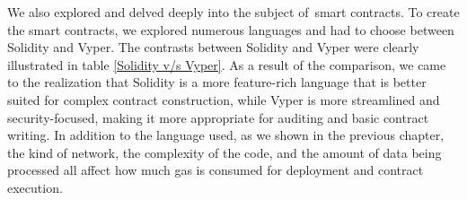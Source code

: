 \vspace{.5cm}

We also explored and delved deeply into the subject of smart contracts. To create the smart contracts, we explored numerous languages and had to choose between Solidity and Vyper. The contrasts between Solidity and Vyper were clearly illustrated in table \ref{Solidity v/s Vyper}. As a result of the comparison, we came to the realization that Solidity is a more feature-rich language that is better suited for complex contract construction, while Vyper is more streamlined and security-focused, making it more appropriate for auditing and basic contract writing. In addition to the language used, as we shown in the previous chapter, the kind of network, the complexity of the code, and the amount of data being processed all affect how much gas is consumed for deployment and contract execution.

\vspace{.5cm}

\begin{table}[h]
\small
\centering
\caption{Solidity v/s Vyper}
\label{Solidity v/s Vyper}
\end{table}

 \vspace{.5cm}

